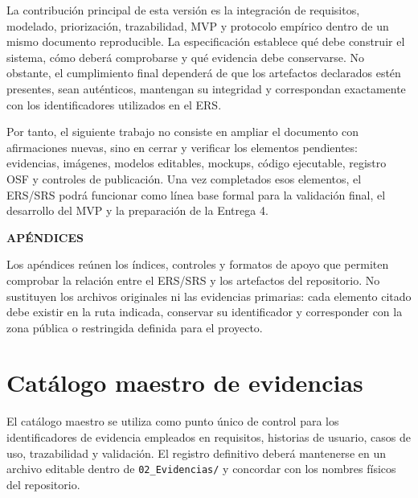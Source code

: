 \documentclass[12pt,a4paper]{article}
\begin{document}
La contribución principal de esta versión es la integración de requisitos, modelado, priorización, trazabilidad, MVP y protocolo empírico dentro de un mismo documento reproducible. La especificación establece qué debe construir el sistema, cómo deberá comprobarse y qué evidencia debe conservarse. No obstante, el cumplimiento final dependerá de que los artefactos declarados estén presentes, sean auténticos, mantengan su integridad y correspondan exactamente con los identificadores utilizados en el ERS.

Por tanto, el siguiente trabajo no consiste en ampliar el documento con afirmaciones nuevas, sino en cerrar y verificar los elementos pendientes: evidencias, imágenes, modelos editables, mockups, código ejecutable, registro OSF y controles de publicación. Una vez completados esos elementos, el ERS/SRS podrá funcionar como línea base formal para la validación final, el desarrollo del MVP y la preparación de la Entrega 4.



\clearpage
\clearpage
{}
\printbibliography[heading=bibintoc,title={Referencias}]

\clearpage
\appendix
{}
{}
\begin{center}
  {\Large\bfseries\color{DocNavy} APÉNDICES}
\end{center}
\vspace{0.5em}

Los apéndices reúnen los índices, controles y formatos de apoyo que permiten comprobar la relación entre el ERS/SRS y los artefactos del repositorio. No sustituyen los archivos originales ni las evidencias primarias: cada elemento citado debe existir en la ruta indicada, conservar su identificador y corresponder con la zona pública o restringida definida para el proyecto.

\section{Catálogo maestro de evidencias}
\label{ap:catalogo-evidencias}

El catálogo maestro se utiliza como punto único de control para los identificadores de evidencia empleados en requisitos, historias de usuario, casos de uso, trazabilidad y validación. El registro definitivo deberá mantenerse en un archivo editable dentro de \nolinkurl{02_Evidencias/} y concordar con los nombres físicos del repositorio.
\end{document}
